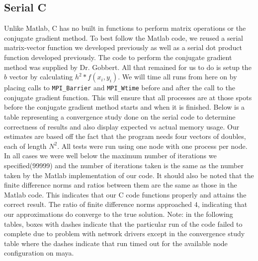 \documentclass[11pt]{article}
\begin{document}
\subsection{Serial C}
Unlike Matlab, C has no built in functions to perform matrix operations or the conjugate gradient method. To best follow the Matlab code, we reused a serial matrix-vector function we developed previously as well as a serial dot product function developed previously. The code to perform the conjugate gradient method was supplied by Dr. Gobbert. All that remained for us to do is setup the $b$ vector by calculating $h^2 * f(x_i, y_i)$. We will time all runs from here on by placing calls to \texttt{MPI\_Barrier} and \texttt{MPI\_Wtime} before and after the call to the conjugate gradient function. This will ensure that all processes are at those spots before the conjugate gradient method starts and when it is finished. Below is a table representing a convergence study done on the serial code to determine correctness of results and also display expected vs actual memory usage. Our estimates are based off the fact that the program needs four vectors of doubles, each of length $N^2$. All tests were run using one node with one process per node. In all cases we were well below the maximum number of iterations we specified(99999) and the number of iterations taken is the same as the number taken by the Matlab implementation of our code. It should also be noted that the finite difference norms and ratios between them are the same as those in the Matlab code. This indicates that our C code functions properly and attains the correct result. The ratio of finite difference norms approached $4$, indicating that our approximations do converge to the true solution. Note: in the following tables, boxes with dashes indicate that the particular run of the code failed to complete due to problem with network drivers except in the convergence study table where the dashes indicate that run timed out for the available node configuration on maya.
\end{document}
